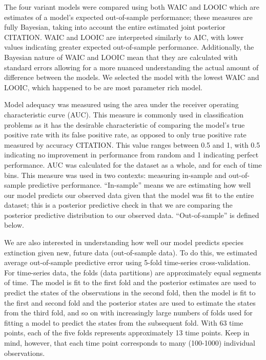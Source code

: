 \documentclass[12pt,letterpaper]{article}
\begin{document}
The four variant models were compared using both WAIC and LOOIC which are estimates of a model's expected out-of-sample performance; these measures are fully Bayesian, taking into account the entire estimated joint posterior CITATION. WAIC and LOOIC are interpreted similarly to AIC, with lower values indicating greater expected out-of-sample performance. Additionally, the Bayesian nature of WAIC and LOOIC mean that they are calculated with standard errors allowing for a more nuanced understanding the actual amount of difference between the models. We selected the model with the lowest WAIC and LOOIC, which happened to be are most parameter rich model.

Model adequacy was measured using the area under the receiver operating characteristic curve (AUC). This measure is commonly used in classification problems as it has the desirable characteristic of comparing the model's true positive rate with its false positive rate, as opposed to only true positive rate measured by accuracy CITATION. This value ranges between 0.5 and 1, with 0.5 indicating no improvement in performance from random and 1 indicating perfect performance. AUC was calculated for the dataset as a whole, and for each of time bins. This measure was used in two contexts: measuring in-sample and out-of-sample predictive performance. ``In-sample'' means we are estimating how well our model predicts our observed data given that the model was fit to the entire dataset; this is a posterior predictive check in that we are comparing the posterior predictive distribution to our observed data. ``Out-of-sample'' is defined below.

We are also interested in understanding how well our model predicts species extinction given new, future data (out-of-sample data). To do this, we estimated average out-of-sample predictive error using 5-fold time-series cross-validation. For time-series data, the folds (data partitions) are approximately equal segments of time. The model is fit to the first fold and the posterior estimates are used to predict the states of the observations in the second fold, then the model is fit to the first and second fold and the posterior states are used to estimate the states from the third fold, and so on with increasingly large numbers of folds used for fitting a model to predict the states from the subsequent fold. With 63 time points, each of the five folds represents approximately 13 time points. Keep in mind, however, that each time point corresponds to many (100-1000) individual observations.
\end{document}
